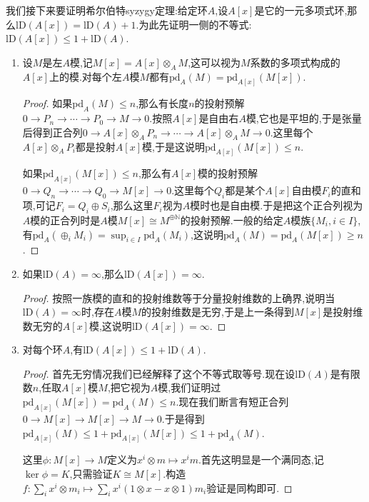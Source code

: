 我们接下来要证明希尔伯特syzygy定理:给定环$A$,设$A[x]$是它的一元多项式环,那么$\mathrm{lD}(A[x])=\mathrm{lD}(A)+1$.为此先证明一侧的不等式:$\mathrm{lD}(A[x])\le1+\mathrm{lD}(A)$.
\begin{enumerate}
	\item 设$M$是左$A$模,记$M[x]=A[x]\otimes_AM$,这可以视为$M$系数的多项式构成的$A[x]$上的模.对每个左$A$模$M$都有$\mathrm{pd}_A(M)=\mathrm{pd}_{A[x]}(M[x])$.
	\begin{proof}
		
		如果$\mathrm{pd}_A(M)\le n$,那么有长度$n$的投射预解$0\to P_n\to\cdots\to P_0\to M\to0$.按照$A[x]$是自由右$A$模,它也是平坦的,于是张量后得到正合列$0\to A[x]\otimes_AP_n\to\cdots\to A[x]\otimes_AM\to0$.这里每个$A[x]\otimes_AP_i$都是投射$A[x]$模,于是这说明$\mathrm{pd}_{A[x]}(M[x])\le n$.
		
		如果$\mathrm{pd}_{A[x]}(M[x])\le n$,那么有$A[x]$模的投射预解$0\to Q_n\to\cdots\to Q_0\to M[x]\to0$.这里每个$Q_i$都是某个$A[x]$自由模$F_i$的直和项,可记$F_i=Q_i\oplus S_i$,那么这里$F_i$视为$A$模时也是自由模.于是把这个正合列视为$A$模的正合列时是$A$模$M[x]\cong M^{\oplus\mathbb{N}}$的投射预解.一般的给定$A$模族$\{M_i,i\in I\}$,有$\mathrm{pd}_A(\oplus_iM_i)=\sup_{i\in I}\mathrm{pd}_A(M_i)$,这说明$\mathrm{pd}_A(M)=\mathrm{pd}_A(M[x])\ge n$.
	\end{proof}
    \item 如果$\mathrm{lD}(A)=\infty$,那么$\mathrm{lD}(A[x])=\infty$.
    \begin{proof}
    	
    	按照一族模的直和的投射维数等于分量投射维数的上确界,说明当$\mathrm{lD}(A)=\infty$时,存在$A$模$M$的投射维数是无穷,于是上一条得到$M[x]$是投射维数无穷的$A[x]$模,这说明$\mathrm{lD}(A[x])=\infty$.
    \end{proof}
    \item 对每个环$A$,有$\mathrm{lD}(A[x])\le1+\mathrm{lD}(A)$.
    \begin{proof}
    	
    	首先无穷情况我们已经解释了这个不等式取等号.现在设$\mathrm{lD}(A)$是有限数$n$,任取$A[x]$模$M$,把它视为$A$模,我们证明过$\mathrm{pd}_{A[x]}(M[x])=\mathrm{pd}_A(M)\le n$.现在我们断言有短正合列$0\to M[x]\to M[x]\to M\to0$.于是得到$\mathrm{pd}_{A[x]}(M)\le1+\mathrm{pd}_{A[x]}(M[x])\le 1+\mathrm{pd}_A(M)$.
    	
    	这里$\phi:M[x]\to M$定义为$x^i\otimes m\mapsto x^im$.首先这明显是一个满同态,记$\ker\phi=K$,只需验证$K\cong M[x]$.构造$f:\sum_ix^i\otimes m_i\mapsto\sum_ix^i(1\otimes x-x\otimes1)m_i$验证是同构即可.
    \end{proof}
\end{enumerate}


